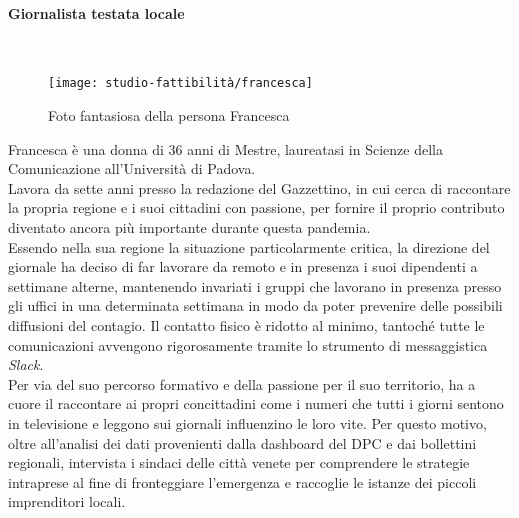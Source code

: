 \paragraph{Giornalista testata locale}\mbox{}\\
\begin{wrapfigure}{l}{7cm}
    \texttt{[image: studio-fattibilità/francesca]}
    \caption{Foto fantasiosa della persona Francesca}
\end{wrapfigure}
Francesca è una donna di 36 anni di Mestre, laureatasi in Scienze della Comunicazione all'Università di Padova.\\ 
Lavora da sette anni presso la redazione del Gazzettino, in cui cerca di raccontare la propria regione e i suoi cittadini con passione, per fornire il proprio contributo diventato ancora più importante durante questa pandemia.\\ 
Essendo nella sua regione la situazione particolarmente critica, la direzione del giornale ha deciso di far lavorare da remoto e in presenza i suoi dipendenti a settimane alterne, mantenendo invariati i gruppi che lavorano in presenza presso gli uffici in una determinata settimana in modo da poter prevenire delle possibili diffusioni del contagio. Il contatto fisico è ridotto al minimo, tantoché tutte le comunicazioni avvengono rigorosamente tramite lo strumento di messaggistica \textit{Slack}.\\ 
Per via del suo percorso formativo e della passione per il suo territorio, ha a cuore il raccontare ai propri concittadini come i numeri che tutti i giorni sentono in televisione e leggono sui giornali influenzino le loro vite. Per questo motivo, oltre all'analisi dei dati provenienti dalla dashboard del DPC e dai bollettini regionali, intervista i sindaci delle città venete per comprendere le strategie intraprese al fine di fronteggiare l'emergenza e raccoglie le istanze dei piccoli imprenditori locali.

